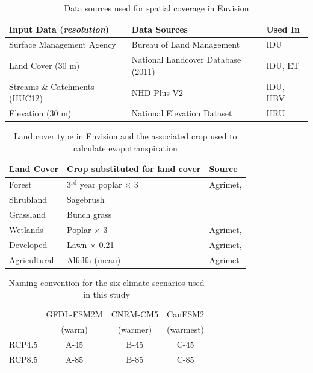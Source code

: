 \documentclass[water,article,submit,moreauthors,pdftex,10pt,a4paper]{mdpi}
\theoremstyle{mdpi}
\newcounter{ex}
\newcounter{re}
\theoremstyle{mdpidefinition}
\begin{document}
%
%
%
%
\begin{table}
\caption{Data sources used for spatial coverage in Envision}
\label{table:DataSources}
\centering
\begin{tabular}{l l l}
\hline\hline
Input Data (\textit{resolution}) & Data Sources & Used In\\
\hline
Surface Management Agency & Bureau of Land Management & IDU \\
Land Cover (30 m) & National Landcover Database (2011) & IDU, ET \\
Streams \& Catchments (HUC12) & NHD Plus V2 & IDU, HBV \\
Elevation (30 m) & National Elevation Dataset & HRU \\
\hline\hline
\end{tabular}
\end{table}
\clearpage

\begin{table}
\caption{Land cover type in Envision and the associated crop used to calculate evapotranspiration}
\label{table:LandCoverType}
\centering
\begin{tabular}{l l l}
\hline\hline
Land Cover & Crop substituted for land cover & Source \\
\hline
Forest & 3${}^{\mathrm{rd}}$ year poplar $\times$ 3 & Agrimet, \citet{Inouye:2014ws} \\
Shrubland & Sagebrush & \citet{Allen:2007ta} \\
Grassland & Bunch grass & \citet{Allen:2007ta} \\
Wetlands & Poplar $\times$ 3 & Agrimet, \citet{Inouye:2014ws} \\
Developed & Lawn $\times$ 0.21 & Agrimet, \citet{Inouye:2014ws} \\
Agricultural & Alfalfa (mean) & Agrimet \\
\hline\hline
\end{tabular}
\end{table}
\clearpage

\begin{table}
\caption{Naming convention for the six climate scenarios used in this study}
\label{table:ExperimentDesign}
\centering
\begin{tabular}{c c c c}
\hline\hline
 & GFDL-ESM2M & CNRM-CM5 & CanESM2 \\
 & (warm) & (warmer) & (warmest) \\
\hline
RCP4.5 & A-45 & B-45 & C-45 \\
RCP8.5 & A-85 & B-85 & C-85 \\
\hline
\hline
\end{tabular}
\end{table}
\clearpage
\end{document}
